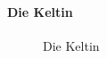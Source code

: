 \documentclass[
  letterpaper,
  DIV=11,
  numbers=noendperiod]{scrartcl}
\let\oldparagraph\paragraph
\renewcommand{\paragraph}[1]{\oldparagraph{#1}\mbox{}}
\begin{document}
\paragraph{Die Keltin}\label{die-keltin}

\begin{figure}


\caption{\label{fig-die-keltin}Die Keltin}

\end{figure}%
\end{document}
